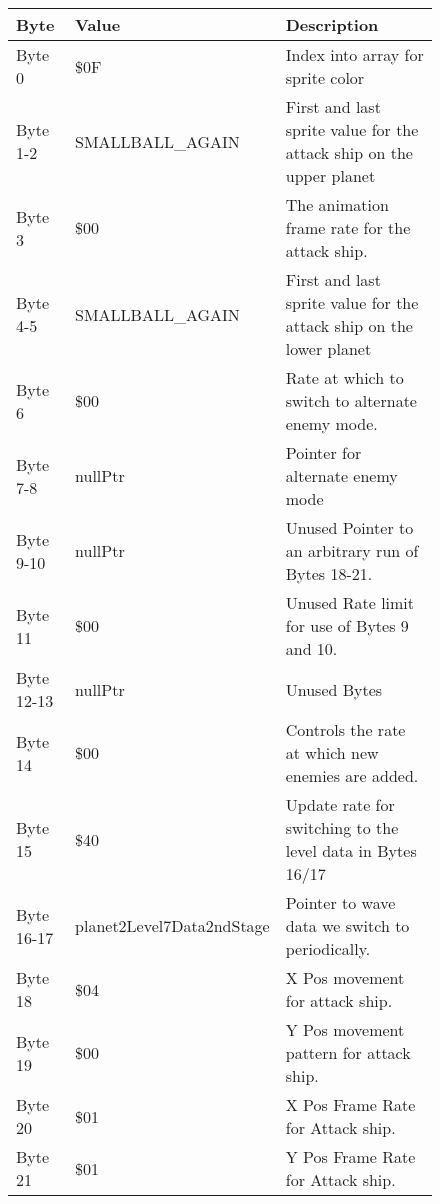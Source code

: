 \begin{figure}[H]
{\begin{adjustbox}{width=12cm}
\begin{tabular}{lll}
\toprule
 Byte       & Value                     & Description                                                         \\
\midrule
 Byte 0     & \$0F                       & Index into array for sprite color                                   \\
 Byte 1-2   & SMALLBALL\_AGAIN           & First and last sprite value for the attack ship on the upper planet \\
 Byte 3     & \$00                       & The animation frame rate for the attack ship.                       \\
 Byte 4-5   & SMALLBALL\_AGAIN           & First and last sprite value for the attack ship on the lower planet \\
 Byte 6     & \$00                       & Rate at which to switch to alternate enemy mode.                    \\
 Byte 7-8   & nullPtr                   & Pointer for alternate enemy mode                                    \\
 Byte 9-10  & nullPtr                   & Unused Pointer to an arbitrary run of Bytes 18-21.                  \\
 Byte 11    & \$00                       & Unused Rate limit for use of Bytes 9 and 10.                        \\
 Byte 12-13 & nullPtr                   & Unused Bytes                                                        \\
 Byte 14    & \$00                       & Controls the rate at which new enemies are added.                   \\
 Byte 15    & \$40                       & Update rate for switching to the level data in Bytes 16/17          \\
 Byte 16-17 & planet2Level7Data2ndStage & Pointer to wave data we switch to periodically.                     \\
 Byte 18    & \$04                       & X Pos movement for attack ship.                                     \\
 Byte 19    & \$00                       & Y Pos movement pattern for attack ship.                             \\
 Byte 20    & \$01                       & X Pos Frame Rate for Attack ship.                                   \\
 Byte 21    & \$01                       & Y Pos Frame Rate for Attack ship.                                   \\

\end{tabular}
\end{adjustbox}}
\end{figure}
